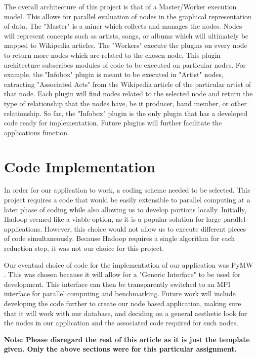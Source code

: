 \documentclass{sig-alternate}
\begin{document}
The overall architecture of this project is that of a Master/Worker execution model. \cite{Garg:2001:TOA:558986}
This allows for parallel evaluation of nodes in the graphical representation of data. 
The "Master" is a miner which collects and manages the nodes. Nodes will represent 
concepts such as artists, songs, or albums which will ultimately be mapped to Wikipedia 
articles. The "Workers" execute the plugins on every node to return more nodes which are 
related to the chosen node. This plugin architecture subscribes modules of code to be 
executed on particular nodes. For example, the "Infobox" plugin is meant to be executed 
in "Artist" nodes, extracting "Associated Acts" from the Wikipedia article of the particular 
artist of that node. Each plugin will find nodes related to the selected node and return 
the type of relationship that the nodes have, be it producer, band member, or other relationship. 
So far, the "Infobox" plugin is the only plugin that has a developed code ready for implementation. 
Future plugins will further facilitate the applications function.

\section{Code Implementation}
\label{code implementation}

In order for our application to work, a coding scheme needed to be selected. This project 
requires a code that would be easily extensible to parallel computing at a later phase of 
coding while also allowing us to develop portions locally. Initially, Hadoop seemed like 
a viable option, as it is a popular solution for large parallel applications. However, 
this choice would not allow us to execute different pieces of code simultaneously. Because 
Hadoop requires a single algorithm for each reduction step, it was not our choice for this project. 

Our eventual choice of code for the implementation of our application was PyMW \cite {ieee5161132}. 
This was chosen because it will allow for a "Generic Interface" to be used for development. 
This interface can then be transparently switched to an MPI interface for parallel computing and 
benchmarking. Future work will include developing the code further to create our node based 
application, making sure that it will work with our database, and deciding on a general 
aesthetic look for the nodes in our application and the associated code required for such nodes. 

{\bf Note: Please disregard the rest of this article as it is just
the template given. Only the above sections were 
for this particular assignment.}
\end{document}
